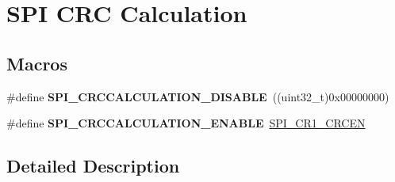 \hypertarget{group___s_p_i___c_r_c___calculation}{}\section{S\+PI C\+RC Calculation}
\label{group___s_p_i___c_r_c___calculation}
\subsection*{Macros}
\begin{DoxyCompactItemize}
\item 
\#define {\bfseries S\+P\+I\+\_\+\+C\+R\+C\+C\+A\+L\+C\+U\+L\+A\+T\+I\+O\+N\+\_\+\+D\+I\+S\+A\+B\+LE}~((uint32\+\_\+t)0x00000000)\hypertarget{group___s_p_i___c_r_c___calculation_ga9cd586b66473d7f207103a443280820e}{}\label{group___s_p_i___c_r_c___calculation_ga9cd586b66473d7f207103a443280820e}

\item 
\#define {\bfseries S\+P\+I\+\_\+\+C\+R\+C\+C\+A\+L\+C\+U\+L\+A\+T\+I\+O\+N\+\_\+\+E\+N\+A\+B\+LE}~\hyperlink{group___peripheral___registers___bits___definition_gac9339b7c6466f09ad26c26b3bb81c51b}{S\+P\+I\+\_\+\+C\+R1\+\_\+\+C\+R\+C\+EN}\hypertarget{group___s_p_i___c_r_c___calculation_ga431d368997c9c41e8923cbcd41b00123}{}\label{group___s_p_i___c_r_c___calculation_ga431d368997c9c41e8923cbcd41b00123}

\end{DoxyCompactItemize}


\subsection{Detailed Description}
